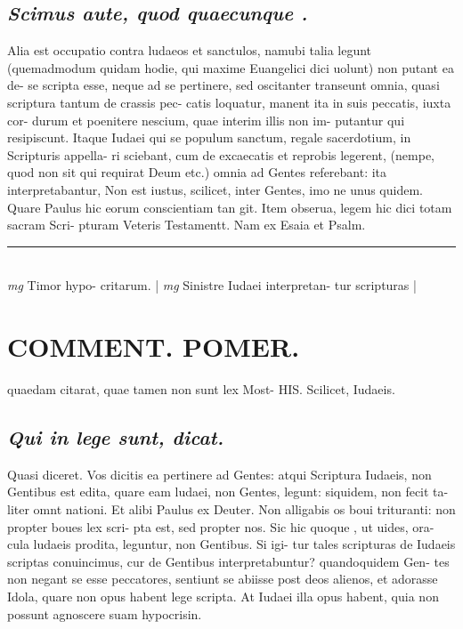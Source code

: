 \documentclass{article}
\begin{document}
\begin{pages}
\subsection*{\textit{Scimus aute, quod quaecunque . }}\pstart Alia est occupatio contra ludaeos et sanctulos, namubi talia legunt (quemadmodum quidam hodie, qui maxime Euangelici dici uolunt) non putant ea de- se scripta esse, neque ad se pertinere, sed oscitanter transeunt omnia, quasi scriptura tantum de crassis pec- catis loquatur, manent ita in suis peccatis, iuxta cor- durum et poenitere nescium, quae interim illis non im- putantur qui resipiscunt. Itaque Iudaei qui se populum sanctum, regale sacerdotium, in Scripturis appella- ri sciebant, cum de excaecatis et reprobis legerent, (nempe, quod non sit qui requirat Deum etc.) omnia ad Gentes referebant: ita interpretabantur, Non est iustus, scilicet, inter Gentes, imo ne unus quidem. Quare Paulus hic eorum conscientiam tan git. Item obserua, legem hic dici totam sacram Scri- pturam Veteris Testamentt. Nam ex Esaia et Psalm.   \pend
\vspace{0.5cm}\noindent
\vspace{0.2cm}\rule{1cm}{0.2pt}\\ 
\hspace{0.2cm}\textit{mg}
\footnotesize Timor hypo- critarum.  
\normalsize| 
\hspace{0.2cm}\textit{mg}
\footnotesize Sinistre Iudaei interpretan- tur scripturas 
\normalsize| 
\section*{COMMENT. POMER.  }\pstart quaedam citarat, quae tamen non sunt lex Most- HIS. Scilicet, Iudaeis.   \pend
{}
{}
\subsection*{\textit{Qui in lege sunt, dicat. }}\pstart Quasi diceret. Vos dicitis ea pertinere ad Gentes: atqui Scriptura Iudaeis, non Gentibus est edita, quare eam ludaei, non Gentes, legunt: siquidem, non fecit ta- liter omnt nationi. Et alibi Paulus ex Deuter. Non alligabis os boui trituranti: non propter boues lex scri- pta est, sed propter nos. Sic hic quoque , ut uides, ora- cula ludaeis prodita, leguntur, non Gentibus. Si igi- tur tales scripturas de Iudaeis scriptas conuincimus, cur de Gentibus interpretabuntur? quandoquidem Gen- tes non negant se esse peccatores, sentiunt se abiisse post deos alienos, et adorasse Idola, quare non opus habent lege scripta. At Iudaei illa opus habent, quia non possunt agnoscere suam hypocrisin.   \pend
{}
{}

\end{pages}
\end{document}
